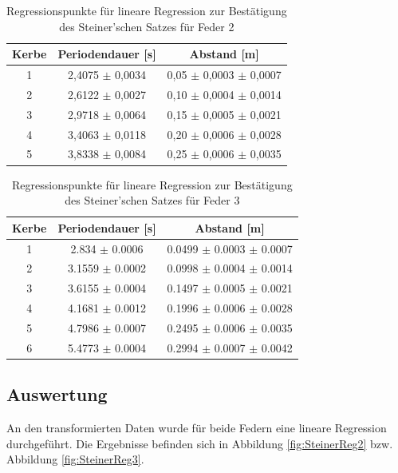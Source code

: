 \documentclass[12pt,a4paper]{article}
\begin{document}
\begin{table}
\caption{Regressionspunkte für lineare Regression zur Bestätigung des Steiner'schen Satzes für Feder 2}
\label{tab:linReg_Punkte_Steiner_Feder2}
\begin{center}
\begin{tabular}{|c|c|c|}
\hline 
Kerbe & Periodendauer [s] & Abstand [m] \\ 
\hline 
1 & 2,4075 $\pm$ 0,0034 & 0,05 $\pm$ 0,0003 $\pm$ 0,0007 \\ 
\hline 
2 & 2,6122 $\pm$ 0,0027 & 0,10 $\pm$ 0,0004 $\pm$ 0,0014 \\ 
\hline 
3 & 2,9718 $\pm$ 0,0064 & 0,15 $\pm$ 0,0005 $\pm$ 0,0021 \\ 
\hline 
4 & 3,4063 $\pm$ 0,0118 & 0,20 $\pm$ 0,0006 $\pm$ 0,0028 \\ 
\hline 
5 & 3,8338 $\pm$ 0,0084 & 0,25 $\pm$ 0,0006 $\pm$ 0,0035 \\ 
\hline 
\end{tabular} 
\end{center}
\end{table}

\begin{table}
\caption{Regressionspunkte für lineare Regression zur Bestätigung des Steiner'schen Satzes für Feder 3}
\label{tab:linReg_Punkte_Steiner_Feder3}
\begin{center}
\begin{tabular}{|c|c|c|}
\hline 
Kerbe & Periodendauer [s] & Abstand [m] \\ 
\hline
1 & 2.834 $\pm$ 0.0006 & 0.0499 $\pm$ 0.0003 $\pm$ 0.0007 \\
\hline
2 & 3.1559 $\pm$ 0.0002 & 0.0998 $\pm$ 0.0004 $\pm$ 0.0014 \\
\hline
3 & 3.6155 $\pm$ 0.0004 & 0.1497 $\pm$ 0.0005 $\pm$ 0.0021 \\
\hline
4 & 4.1681 $\pm$ 0.0012 & 0.1996 $\pm$ 0.0006 $\pm$ 0.0028 \\
\hline
5 & 4.7986 $\pm$ 0.0007 & 0.2495 $\pm$ 0.0006 $\pm$ 0.0035 \\
\hline
6 & 5.4773 $\pm$ 0.0004 & 0.2994 $\pm$ 0.0007 $\pm$ 0.0042 \\
\hline
\end{tabular} 
\end{center}
\end{table}

\subsection{Auswertung}
An den transformierten Daten wurde für beide Federn eine lineare Regression durchgeführt. Die Ergebnisse befinden sich in Abbildung \ref{fig:SteinerReg2} bzw. Abbildung \ref{fig:SteinerReg3}.
\end{document}
